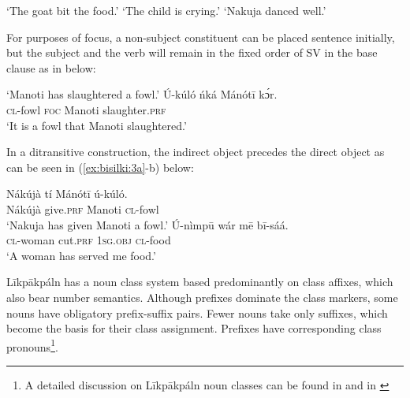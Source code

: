 \documentclass[output=paper,colorlinks,citecolor=brown]{langscibook}
\begin{document}
\ea%
    \label{ex:bisilki:1}
    \jambox*{[SVO]}
    \glt    ‘The goat bit the food.’
    \jambox*{[SV]}
	\glt    ‘The child is crying.’
    \jambox*{[SVA]}
    \glt    ‘Nakuja danced well.’
    \z
\z

For purposes of focus, a non-subject constituent can be placed sentence initially, but the subject and the verb will remain in the fixed order of SV in the base clause as in  below:

\ea%
    \label{ex:bisilki:2}
    \glt    ‘Manoti has slaughtered a fowl.’
    \ex\label{ex:bisilki:2b}
    \gll    Ú-kúló	ńká	Mánótī	kɔ́r.\\
            \textsc{cl-}fowl	\textsc{foc}	Manoti	slaughter\textsc{.prf}\\
    \glt    ‘It is a fowl that Manoti slaughtered.’
    \z
\z

In a ditransitive construction, the indirect object precedes the direct object as can be seen in (\ref{ex:bisilki:3a}-b) below:

\ea%
    \label{ex:bisilki:3}
    \ea\label{ex:bisilki:3a}
    \gll    Nákújà 	tí		Mánótī	ú-kúló.\\
             Nákújà give\textsc{.prf} 	Manoti	\textsc{cl-}fowl\\
    \glt    ‘Nakuja has given Manoti a fowl.’
    \ex\label{ex:bisilki:3b}
    \gll    Ú-nìmpū	wár		mē		bī-sáá.\\
            \textsc{cl-}woman	cut\textsc{.prf}	\textsc{1sg.obj}	\textsc{cl-}food\\
    \glt    ‘A woman has served me food.’
    \z
\z

Līkpākpáln has a  noun class system based predominantly on class affixes, which also bear number semantics. Although prefixes dominate the class markers, some nouns have obligatory prefix-suffix pairs. Fewer nouns take only suffixes, which become the basis for their class assignment. Prefixes have corresponding class pronouns\footnote{A detailed discussion on Līkpākpáln noun classes can be found in \cite{BisilkiAkpanglo-Nartey2017} and in \cite{Winkelmann2012} }.
\end{document}
